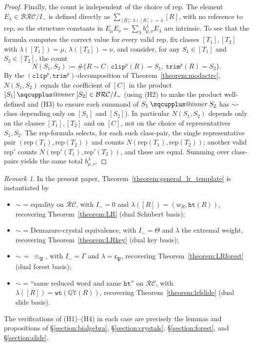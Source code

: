 \documentclass[a4paper,fleqn]{cas-sc}
\makeatletter
\newcommand{\sqcupplus@inner}[2]{%
  \vcenter{\hbox{\ooalign{%
    \hfil$\m@th#1\sqcup$\hfil\cr
    \hfil\raisebox{0.15ex}{$\m@th#1\scriptscriptstyle+$}\hfil\cr
  }}}%
}
\newcommand{\sqcupplus}{\mathbin{\mathpalette\sqcupplus@inner\relax}}
\theoremstyle{definition}
\theoremstyle{remark}
\newtheorem*{remark}{Remark}
\numberwithin{equation}{subsection}
\newcommand{\wof}[1]{w_{#1}}
\newcommand{\wtt}{\mathtt{wt}}
\newcommand{\QY}{\ensuremath{\mathbb{QY}}}
\newcommand{\trm}{\mathtt{trim}}
\newcommand{\hr}{\mathtt{ht}}
\newcommand{\clp}{\mathtt{clip}}
\newcommand{\BRC}{\mathcal{BRC}}
\newcommand{\RC}{\mathcal{RC}}
\newcommand{\forest}{\mathfrak{P}}
\newcommand{\fcode}{\mathfrak{c}_\forest}
\makeatother
\begin{document}
\begin{proof}
Finally, the count is independent of the choice of $\mathrm{rep}$. The element $E_\lambda\in\BRC/I_\sim$ is defined directly as $\sum_{[R]:\lambda([R])=\lambda}[R]$, with no reference to $\mathrm{rep}$, so the structure constants in $E_\mu E_\nu=\sum_\lambda b_{\mu,\nu}^\lambda E_\lambda$ are intrinsic. To see that the formula computes the correct value for every valid $\mathrm{rep}$, fix classes $[T_1],[T_2]$ with $\lambda([T_1])=\mu$, $\lambda([T_2])=\nu$, and consider, for any $S_1\in[T_1]$ and $S_2\in[T_2]$, the count
$$N(S_1,S_2):=\#\{R\sim C\,:\,\clp^p(R)=S_1,\ \trm^p(R)=S_2\}.$$
By the $(\clp^p,\trm^p)$-decomposition of Theorem~\ref{theorem:modactrc}, $N(S_1,S_2)$ equals the coefficient of $[C]$ in the product $[S_1]\sqcupplus[S_2]\in\BRC/I_\sim$ (using (H2) to make the product well-defined and (H3) to ensure each summand of $S_1\sqcupplus S_2$ has $\sim$-class depending only on $[S_1]$ and $[S_2]$). In particular $N(S_1,S_2)$ depends only on the classes $[T_1],[T_2]$ and on $[C]$, not on the choice of representatives $S_1,S_2$. The $\mathrm{rep}$-formula selects, for each such class-pair, the single representative pair $(\mathrm{rep}(T_1),\mathrm{rep}(T_2))$ and counts $N(\mathrm{rep}(T_1),\mathrm{rep}(T_2))$; another valid $\mathrm{rep}'$ counts $N(\mathrm{rep}'(T_1),\mathrm{rep}'(T_2))$, and these are equal. Summing over class-pairs yields the same total $b_{\mu,\nu}^\lambda$.
\end{proof}

\begin{remark}\label{remark:general_lr_instances}
In the present paper, Theorem~\ref{theorem:general_lr_template} is instantiated by
\begin{itemize}
\item $\sim$ = equality on $\RC$, with $I_\sim=0$ and $\lambda([R])=(\wof{R},\hr(R))$, recovering Theorem~\ref{theorem:LR} (dual Schubert basis);
\item $\sim$ = Demazure-crystal equivalence, with $I_\sim=\Theta$ and $\lambda$ the extremal weight, recovering Theorem~\ref{theorem:LRkey} (dual key basis);
\item $\sim\,=\,\equiv_\forest$, with $I_\sim=\Gamma$ and $\lambda=\fcode$, recovering Theorem~\ref{theorem:LRforest} (dual forest basis);
\item $\sim$ = ``same reduced word and same $\hr$'' on $\RC$, with $\lambda([R])=\wtt(\QY(R))$, recovering Theorem~\ref{theorem:lrfslide} (dual slide basis).
\end{itemize}
The verifications of (H1)--(H4) in each case are precisely the lemmas and propositions of \S\ref{section:bialgebra}, \S\ref{section:crystals}, \S\ref{section:forest}, and \S\ref{section:slide}.
\end{remark}
\end{document}
